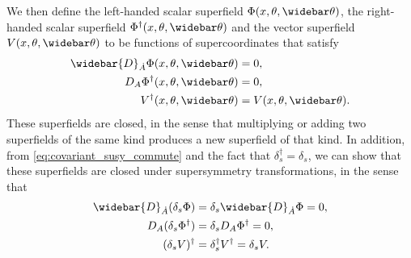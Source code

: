 We then define the left-handed scalar superfield $\Phi(x,\theta,\thetabar)$, the right-handed scalar superfield $\Phi^\dagger(x,\theta,\thetabar)$ and the vector superfield $V(x,\theta,\thetabar)$ to be functions of supercoordinates that satisfy
\begin{subequations}
\begin{align}
    \widebar{D}_{\dot{A}} \Phi(x,\theta,\thetabar) &= 0,
    \\
    D_A \Phi^\dagger(x,\theta,\thetabar) &= 0,
    \\
    V^\dagger(x,\theta,\thetabar) &= V(x,\theta,\thetabar).
\end{align}
\end{subequations}
These superfields are closed, in the sense that multiplying or adding two superfields of the same kind produces a new superfield of that kind. In addition, from \cref{eq:covariant_susy_commute} and the fact that $\delta_s^\dagger=\delta_s$, we can show that these superfields are closed under supersymmetry transformations, in the sense that
\begin{subequations}
\begin{align}
    \widebar{D}_{\dot{A}}(\delta_s\Phi) &= \delta_s\widebar{D}_{\dot{A}}\Phi = 0,
    \\
    D_A(\delta_s\Phi^\dagger) &= \delta_s D_A \Phi^\dagger = 0,
    \\
    (\delta_s V)^\dagger &= \delta_s^\dagger V^\dagger = \delta_s V.
\end{align}
\end{subequations}


